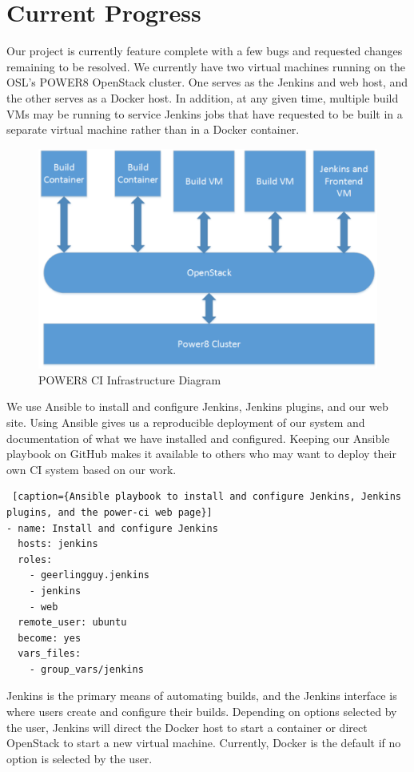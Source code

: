 \documentclass[10pt,onecolumn,journal,draftclsnofoot]{IEEEtran}
\begin{document}
\section{Current Progress}
Our project is currently feature complete with a few bugs and requested changes remaining to be resolved.
We currently have two virtual machines running on the OSL's POWER8 OpenStack cluster.
One serves as the Jenkins and web host, and the other serves as a Docker host. 
In addition, at any given time, multiple build VMs may be running to service Jenkins jobs that have requested to be built in a separate virtual machine rather than in a Docker container.\\
\begin{figure}[H] 
  \includegraphics[width=\textwidth]{images/infrastructure_diagram.eps}
  \caption{POWER8 CI Infrastructure Diagram}
\end{figure}

We use Ansible to install and configure Jenkins, Jenkins plugins, and our web site.
Using Ansible gives us a reproducible deployment of our system and documentation of what we have installed and configured.
Keeping our Ansible playbook on GitHub makes it available to others who may want to deploy their own CI system based on our work.

\begin{lstlisting} [caption={Ansible playbook to install and configure Jenkins, Jenkins plugins, and the power-ci web page}]
- name: Install and configure Jenkins
  hosts: jenkins
  roles:
    - geerlingguy.jenkins
    - jenkins
    - web
  remote_user: ubuntu
  become: yes
  vars_files:
    - group_vars/jenkins
\end{lstlisting} 
Jenkins is the primary means of automating builds, and the Jenkins interface is where users create and configure their builds.
Depending on options selected by the user, Jenkins will direct the Docker host to start a container or direct OpenStack to start
a new virtual machine. 
Currently, Docker is the default if no option is selected by the user.
\end{document}
